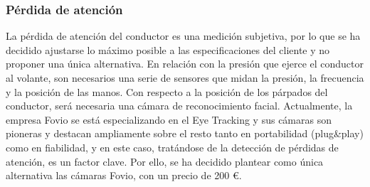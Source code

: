 \subsubsection{Pérdida de atención}
\par La pérdida de atención del conductor es una medición subjetiva, por lo que se ha decidido ajustarse lo máximo posible a las especificaciones del cliente y no proponer una única alternativa. En relación con la presión que ejerce el conductor al volante, son necesarios una serie de sensores que midan la presión, la frecuencia y la posición de las manos. Con respecto a la posición de los párpados del conductor, será necesaria una cámara de reconocimiento facial. Actualmente, la empresa Fovio se está especializando en el Eye Tracking  y sus cámaras son pioneras y destacan ampliamente  sobre el resto tanto en portabilidad (plug\&play) como en fiabilidad, y en este caso, tratándose de la detección de pérdidas de atención, es un factor clave. Por ello, se ha decidido plantear como única alternativa las cámaras Fovio, con un precio de 200 \euro.
